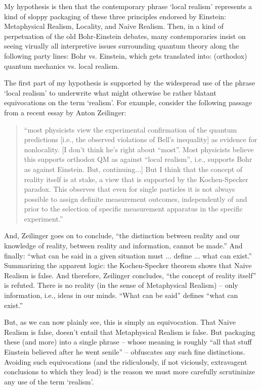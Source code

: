 \documentclass[12pt]{article}
\begin{document}
My hypothesis is then that the contemporary phrase `local realism'
represents a kind of sloppy packaging of these three principles endorsed
by Einstein:  Metaphysical Realism, Locality, and Naive Realism.
Then, in a kind of perpetuation of the old Bohr-Einstein debates, many
contemporaries insist on seeing virually all interpretive issues surrounding
quantum theory along the following party lines:  Bohr vs. Einstein,
which gets translated into:  (orthodox) quantum mechanics vs. local
realism.  

The first part of my hypothesis is supported by the widespread
use of the phrase `local realism' to underwrite what might otherwise
be rather blatant equivocations on the term `realism'.  For example,
consider the following passage from a recent essay by Anton 
Zeilinger:
\begin{quote}
``most physicists view the experimental confirmation of the quantum 
predictions [i.e., the observed violations of Bell's inequality] 
as evidence for nonlocality.  [I don't think he's right about
``most''.  Most physicists believe this supports orthodox QM as
against ``local realism'', i.e., supports Bohr as against Einstein.
But, continuing...]  But I
think that the concept of reality itself is at stake, a view that is
supported by the Kochen-Specker paradox.  This observes that even for
single particles it is not always possible to assign definite
measurement outcomes, independently of and prior to the selection of
specific measurement apparatus in the specific experiment.''
\cite{zeilinger} 
\end{quote}
And, Zeilinger goes on to conclude, ``the distinction between reality
and our knowledge of reality, between reality and information, cannot
be made.''  And finally:  ``what can be said in a given situation must
... define ... what can exist.''
Summarizing the apparent logic: 
the Kochen-Specker theorem shows that Naive Realism 
is false.  And therefore,
Zeilinger concludes, ``the concept of reality itself'' is refuted.
There is no reality (in the sense of Metaphysical Realism) -- only
information, i.e., ideas in our minds.  ``What can be said'' defines
``what can exist.''

But, as we can now plainly see, this is simply an
equivocation.  That Naive Realism is false, doesn't entail that
Metaphysical Realism is false.  But packaging these (and more) into a
single phrase -- whose meaning is roughly ``all that stuff Einstein
believed after he went senile'' -- obfuscates any such fine distinctions.
Avoiding such equivocations
(and the ridiculously, if not viciously, extravagent conclusions to
which they lead) is the reason we must more carefully
scrutininize any use of the term `realism'.  
\end{document}
